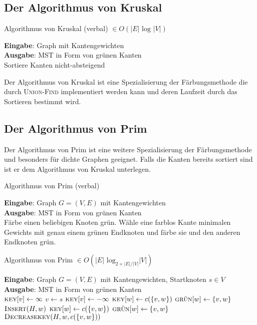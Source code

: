 \documentclass[a4paper,10pt]{scrartcl}
\newcommand{\tbf}{\textbf}
\newcommand{\tsc}{\textsc}
\newcommand{\agn}{\leftarrow}
\newcommand{\Eingabe}[1]{\STATE \tbf{Eingabe}: #1 \\}
\newcommand{\Ausgabe}[1]{\STATE \tbf{Ausgabe}: #1 \\}
\begin{document}
\subsection{Der Algorithmus von \textsf{Kruskal}}
\begin{algorithm}
\caption{Algorithmus von \textsf{Kruskal} (verbal) $\in O(|E| \text{ log } |V|)$}
\begin{algorithmic}
\Eingabe{Graph mit Kantengewichten}
\Ausgabe{MST in Form von grünen Kanten}
\STATE Sortiere Kanten nicht-absteigend
	\ELSE
	\ENDIF
\ENDFOR
\end{algorithmic}
\end{algorithm}

Der Algorithmus von \textsf{Kruskal} ist eine Spezialisierung der Färbungsmethode die durch \tsc{Union-Find} implementiert werden kann und deren Laufzeit durch das Sortieren bestimmt wird.

\subsection{Der Algorithmus von \textsf{Prim}}

Der Algorithmus von \textsf{Prim} ist eine weitere Spezialisierung der Färbungsmethode und besonders für dichte Graphen geeignet. Falls die Kanten bereits sortiert sind ist er dem Algorithmus von \textsf{Kruskal} unterlegen.

\begin{algorithm}
\caption{Algorithmus von \textsf{Prim} (verbal)}
\begin{algorithmic}
\Eingabe{Graph $G = (V, E)$ mit Kantengewichten}
\Ausgabe{MST in Form von grünen Kanten}
\STATE Färbe einen beliebigen Knoten grün.
	\STATE Wähle eine farblos Kante minimalen Gewichts mit genau einem grünen Endknoten und färbe sie und den anderen Endknoten grün.
\ENDFOR
\end{algorithmic}
\end{algorithm}

\begin{algorithm}
\caption{Algorithmus von \textsf{Prim} $\in O(|E| \text{ log}_{2 + |E| / |V|}  |V|)$}
\begin{algorithmic}
\Eingabe{Graph $G = (V, E)$ mit Kantengewichten, Startknoten $s \in V$}
\Ausgabe{MST in Form von grünen Kanten}
	\STATE $\tsc{key}[v] \agn \infty$
\ENDFOR
\STATE $v \agn s$
	\STATE $\tsc{key}[v] \agn - \infty$
		\IF{$\tsc{key}[w] = \infty$}
			\STATE $\tsc{key}[w] \agn c(\{v,w\})$
			\STATE $\tsc{grün}[w] \agn \{v,w\}$
			\STATE $\tsc{Insert}(H,w)$
		\ELSE
			\IF{$c(\{v,w\} < \tsc{key}[w]$}
				\STATE $\tsc{key}[w] \agn c(\{v,w\})$
				\STATE $\tsc{grün}[w] \agn \{v,w\}$
				\STATE $\tsc{Decreasekey}(H,w,c(\{v,w\}))$
			\ENDIF
		\ENDIF
	\ENDFOR
\ENDWHILE		
\end{algorithmic}
\end{algorithm}
\end{document}
